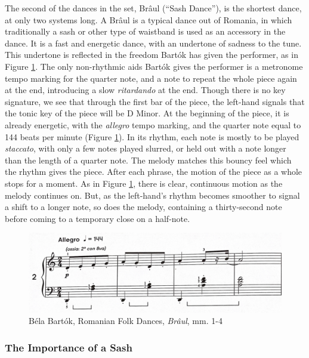 The second of the dances in the set, Brâul (``Sash Dance''), is the shortest dance, at only two systems long. A Brâul is a typical dance out of Romania, in which traditionally a sash or other type of waistband is used as an accessory in the dance. It is a fast and energetic dance, with an undertone of sadness to the tune. This undertone is reflected in the freedom Bartók has given the performer, as in Figure \ref{fig:Bartók-waistband-dance-interpretation}\autocite{Lung_2016}. The only non-rhythmic aids Bartók gives the performer is a metronome tempo marking for the quarter note, and a note to repeat the whole piece again at the end, introducing a slow \textit{ritardando} at the end. Though there is no key signature, we see that through the first bar of the piece, the left-hand signals that the tonic key of the piece will be D Minor. At the beginning of the piece, it is already energetic, with the \textit{allegro} tempo marking, and the quarter note equal to 144 beats per minute (Figure \ref{fig:Bartók-waistband-dance-interpretation}\autocite{Lung_2016}). In its rhythm, each note is mostly to be played \textit{staccato}, with only a few notes played slurred, or held out with a note longer than the length of a quarter note. The melody matches this bouncy feel which the rhythm gives the piece. After each phrase, the motion of the piece as a whole stops for a moment. As in Figure \ref{fig:Bartók-waistband-dance-interpretation}\autocite{Lung_2016}, there is clear, continuous motion as the melody continues on. But, as the left-hand's rhythm becomes smoother to signal a shift to a longer note, so does the melody, containing a thirty-second note before coming to a temporary close on a half-note. 

\begin{figure}[h]
  \centering
  \includegraphics[width=\textwidth]{figures/bartok-waistband-dance-tempo-marking-and-dynamic.jpg}
  \caption{Béla Bartók, Romanian Folk Dances, \textit{Brâul}, mm. 1-4}
  \label{fig:Bartók-waistband-dance-interpretation}
\end{figure}

\subsubsection{The Importance of a Sash}

